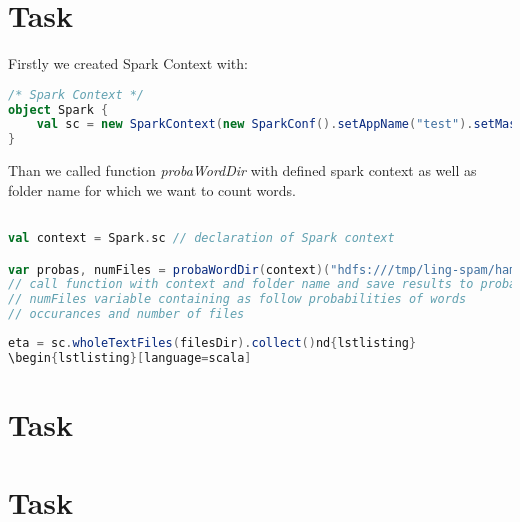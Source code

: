 \documentclass[paper=a4, fontsize=11pt]{scrartcl}
\numberwithin{equation}{section}		%
\numberwithin{figure}{section}			%
\numberwithin{table}{section}				%
\begin{document}
\section{Task}
Firstly we created Spark Context with:
\begin{lstlisting}[language=scala]
/* Spark Context */
object Spark {
    val sc = new SparkContext(new SparkConf().setAppName("test").setMaster("local[*]"))
}
\end{lstlisting}
Than we called function \textit{probaWordDir} with defined spark context as well as folder name for which we want to count words.
\begin{lstlisting}[language=scala]

val context = Spark.sc // declaration of Spark context

var probas, numFiles = probaWordDir(context)("hdfs:///tmp/ling-spam/ham/ham/") 
// call function with context and folder name and save results to probas and 
// numFiles variable containing as follow probabilities of words 
// occurances and number of files
\end{lstlisting}
\begin{lstlisting}[language=scala]
eta = sc.wholeTextFiles(filesDir).collect()nd{lstlisting}
\begin{lstlisting}[language=scala]

\end{lstlisting}


\section{Task}
\section{Task}
\end{document}
